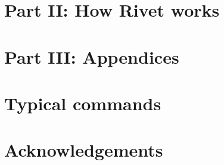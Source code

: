 \documentclass[epjc3]{svjour3}       %
\def\part#1{\section*{\large #1}}
\begin{document}
\cleardoublepage

\part{Part II: How Rivet works}
\label{part:writinganalyses}


\cleardoublepage

\part{Part III: Appendices}
\appendix

\section{Typical  commands}
\label{app:agilerunmc}


\section{Acknowledgements}
\label{app:acknowledgements}



\cleardoublepage



\end{document}
